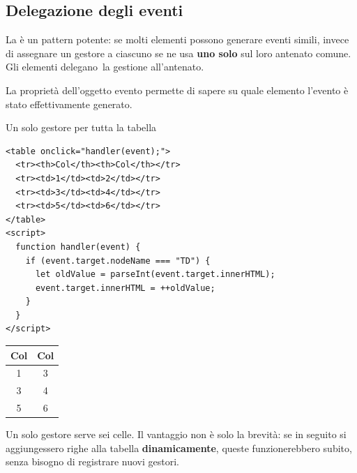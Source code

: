 \subsection{Delegazione degli eventi}

La  è un pattern potente: se molti elementi
possono generare eventi simili, invece di assegnare un gestore a ciascuno se ne
usa \textbf{uno solo} sul loro antenato comune. Gli elementi
\guillemotleft delegano\guillemotright\ la gestione all'antenato.

La proprietà  dell'oggetto evento permette di sapere su quale
elemento l'evento è stato effettivamente generato.

\begin{esempio}{Un solo gestore per tutta la tabella}
\begin{affianco}[0.58][c]
\begin{lstlisting}[style=html, name=delegazione.html]
<table onclick="handler(event);">
  <tr><th>Col</th><th>Col</th></tr>
  <tr><td>1</td><td>2</td></tr>
  <tr><td>3</td><td>4</td></tr>
  <tr><td>5</td><td>6</td></tr>
</table>
<script>
  function handler(event) {
    if (event.target.nodeName === "TD") {
      let oldValue = parseInt(event.target.innerHTML);
      event.target.innerHTML = ++oldValue;
    }
  }
</script>
\end{lstlisting}
\risultato
\begin{browser}
  \renewcommand{\arraystretch}{1.25}%
  \begin{tabular}{|c|c|}
    \hline \textbf{Col} & \textbf{Col} \\
    \hline 1 & \colorbox{accent!18!white}{3} \\
    \hline 3 & 4 \\
    \hline 5 & 6 \\ \hline
  \end{tabular}
\end{browser}
\end{affianco}

Un solo gestore serve sei celle. Il vantaggio non è solo la brevità: se in
seguito si aggiungessero righe alla tabella \textbf{dinamicamente}, queste
funzionerebbero subito, senza bisogno di registrare nuovi gestori.
\end{esempio}

